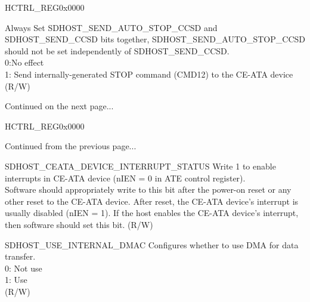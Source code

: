 \begin{register}{H}{CTRL\_REG}{0x0000}
\begin{regdesc}
\begin{reglist}
Always Set SDHOST\_SEND\_AUTO\_STOP\_CCSD and SDHOST\_SEND\_CCSD bits together, SDHOST\_SEND\_AUTO\_STOP\_CCSD should not be set independently of SDHOST\_SEND\_CCSD. \\
0:No effect\\1: Send internally-generated STOP command (CMD12) to the CE-ATA device\\(R/W)

\item [Continued on the next page...]
\end{reglist}\end{regdesc}
\end{register}

\addtocounter{Regfloat}{-1}
\begin{register}{H}{CTRL\_REG}{0x0000}
\begin{regdesc}\begin{reglist}
\item [Continued from the previous page...]

\label{fielddesc:SDHOSTCEATADEVICEINTERRUPTSTATUS}\item [SDHOST\_CEATA\_DEVICE\_INTERRUPT\_STATUS] Write 1 to enable interrupts in CE-ATA device (nIEN = 0 in ATE control register). \\
Software should appropriately write to this bit after the power-on reset or any other reset to the CE-ATA device. After reset, the CE-ATA device's interrupt is usually disabled (nIEN = 1). If the host enables the CE-ATA device's interrupt, then software should set this bit. (R/W)
\label{fielddesc:SDHOSTUSEINTERNALDMAC}\item [SDHOST\_USE\_INTERNAL\_DMAC] Configures whether to use DMA for data transfer.\\0: Not use\\1: Use\\(R/W)
\end{reglist}\end{regdesc}
\end{register}


